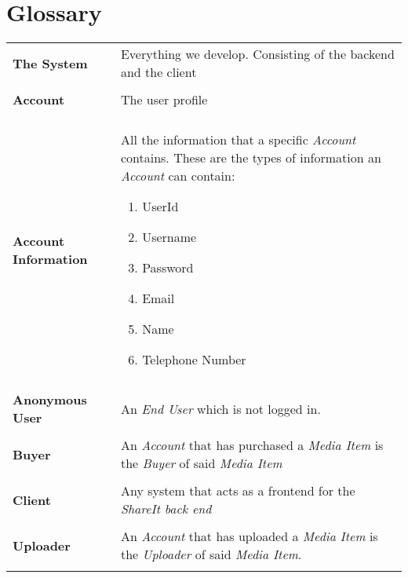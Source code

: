 \documentclass[../report.tex]{subfiles}
\begin{document}
\section{Glossary}
\begin{tabular}{l p{10 cm}}
\textbf{The System} & Everything we develop. Consisting of the backend and the client \\ \\
\textbf{Account} & The user profile \\ \\
\textbf{Account Information} & All the information  that a specific \textit{Account} contains. These are the types of information an \textit{Account} can contain:
\begin{enumerate}
\item UserId
\item Username
\item Password
\item Email
\item Name
\item Telephone Number
\end{enumerate}\\ \\
\textbf{Anonymous User} & An \textit{End User} which is not logged in.\\ \\
\textbf{Buyer} & An \textit{Account} that has purchased a \textit{Media Item} is the \textit{Buyer} of said \textit{Media Item} \\ \\
\textbf{Client} & Any system that acts as a frontend for the \textit{ShareIt back end} \\ \\
\textbf{Uploader} & An \textit{Account} that has uploaded a \textit{Media Item} is the \textit{Uploader} of said \textit{Media Item}. \\ \\ %
\end{tabular}
\end{document}
